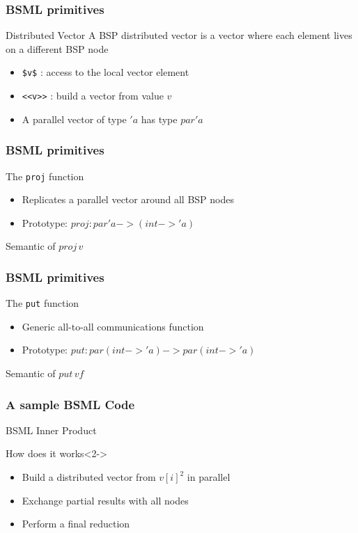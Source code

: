 \frame
{
  \frametitle{BSML primitives}
  \begin{block}{Distributed Vector}
  \footnotesize
   A BSP distributed vector is a vector where each element lives on a different BSP node
  \begin{itemize}
  \footnotesize
  \item \texttt{\$v\$} : access to the local vector element
  \item \texttt{<<v>>} : build a vector from value $v$
  \item A parallel vector of type $'a$ has type $par 'a$
  \end{itemize}
  \end{block}
}

\frame
{
  \frametitle{BSML primitives}
  \begin{block}{The \texttt{proj} function}
  \footnotesize
   \begin{itemize}
  \footnotesize
  \item Replicates a parallel vector around all BSP nodes
  \item Prototype: $proj : par 'a -> (int-> 'a)$
  \end{itemize}
  \end{block}

  \begin{block}{Semantic of $proj \, v$}
  \begin{center}\end{center}
  \end{block}
}

\frame
{
  \frametitle{BSML primitives}
  \begin{block}{The \texttt{put} function}
  \footnotesize
   \begin{itemize}
  \footnotesize
  \item Generic all-to-all communications function
  \item Prototype: $put : par (int-> 'a) -> par (int-> 'a)$
  \end{itemize}
  \end{block}

  \begin{block}{Semantic of $put \, vf$}
  \begin{center}\end{center}
  \end{block}
}

\frame
{
  \frametitle{A sample BSML Code}
  \begin{block}{BSML Inner Product}
  \lstbsml
  \end{block}

  \begin{block}{How does it works}<2->
  \begin{itemize}
  \footnotesize
  \item Build a distributed vector from $v[i]^2$ in parallel
  \item Exchange partial results with all nodes
  \item Perform a final reduction
  \end{itemize}
  \end{block}
}

